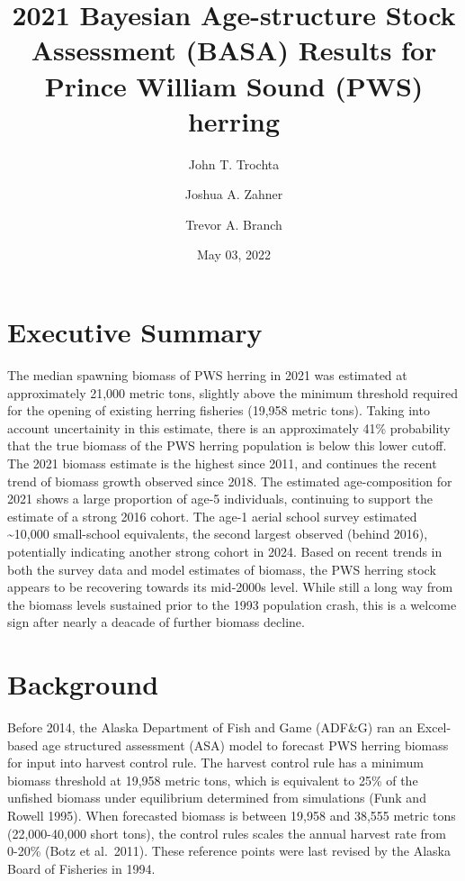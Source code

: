 \documentclass[
  11pt,
]{article}
\title{2021 Bayesian Age-structure Stock Assessment (BASA) Results for
Prince William Sound (PWS) herring}
\author{John T. Trochta \and Joshua A. Zahner \and Trevor A. Branch}
\date{May 03, 2022}
\begin{document}
\maketitle

\hypertarget{executive-summary}{%
\section{Executive Summary}\label{executive-summary}}

The median spawning biomass of PWS herring in 2021 was estimated at
approximately 21,000 metric tons, slightly above the minimum threshold
required for the opening of existing herring fisheries (19,958 metric
tons). Taking into account uncertainity in this estimate, there is an
approximately 41\% probability that the true biomass of the PWS herring
population is below this lower cutoff. The 2021 biomass estimate is the
highest since 2011, and continues the recent trend of biomass growth
observed since 2018. The estimated age-composition for 2021 shows a
large proportion of age-5 individuals, continuing to support the
estimate of a strong 2016 cohort. The age-1 aerial school survey
estimated \textasciitilde10,000 small-school equivalents, the second
largest observed (behind 2016), potentially indicating another strong
cohort in 2024. Based on recent trends in both the survey data and model
estimates of biomass, the PWS herring stock appears to be recovering
towards its mid-2000s level. While still a long way from the biomass
levels sustained prior to the 1993 population crash, this is a welcome
sign after nearly a deacade of further biomass decline.

\hypertarget{background}{%
\section{Background}\label{background}}

Before 2014, the Alaska Department of Fish and Game (ADF\&G) ran an
Excel-based age structured assessment (ASA) model to forecast PWS
herring biomass for input into harvest control rule. The harvest control
rule has a minimum biomass threshold at 19,958 metric tons, which is
equivalent to 25\% of the unfished biomass under equilibrium determined
from simulations (Funk and Rowell 1995). When forecasted biomass is
between 19,958 and 38,555 metric tons (22,000-40,000 short tons), the
control rules scales the annual harvest rate from 0-20\% (Botz et
al.~2011). These reference points were last revised by the Alaska Board
of Fisheries in 1994.
\end{document}
